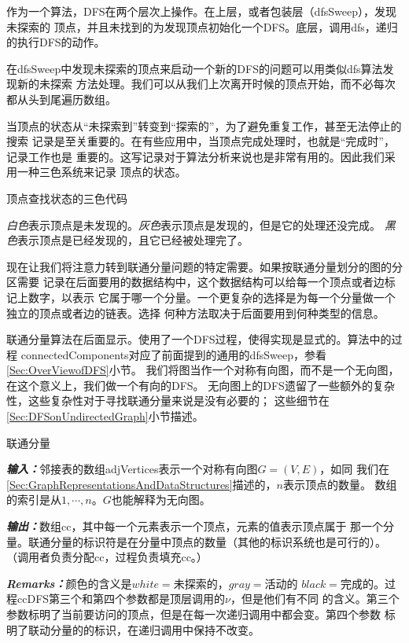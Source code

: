 作为一个算法，DFS在两个层次上操作。在上层，或者包装层（dfsSweep），发现未探索的
顶点，并且未找到的为发现顶点初始化一个DFS。底层，调用dfs，递归的执行DFS的动作。

在dfsSweep中发现未探索的顶点来启动一个新的DFS的问题可以用类似dfs算法发现新的未探索
方法处理。我们可以从我们上次离开时候的顶点开始，而不必每次都从头到尾遍历数组。

当顶点的状态从“未探索到”转变到“探索的”，为了避免重复工作，甚至无法停止的搜索
记录是至关重要的。在有些应用中，当顶点完成处理时，也就是“完成时”，记录工作也是
重要的。这写记录对于算法分析来说也是非常有用的。因此我们采用一种三色系统来记录
顶点的状态。

\begin{definition}
顶点查找状态的三色代码

\emph{白色}表示顶点是未发现的。\emph{灰色}表示顶点是发现的，但是它的处理还没完成。
\emph{黑色}表示顶点是已经发现的，且它已经被处理完了。
\end{definition}

现在让我们将注意力转到联通分量问题的特定需要。如果按联通分量划分的图的分区需要
记录在后面要用的数据结构中，这个数据结构可以给每一个顶点或者边标记上数字，以表示
它属于哪一个分量。一个更复杂的选择是为每一个分量做一个独立的顶点或者边的链表。选择
何种方法取决于后面要用到何种类型的信息。

联通分量算法在后面显示。使用了一个DFS过程，使得实现是显式的。算法中的过程
connectedComponents对应了前面提到的通用的dfsSweep，参看\ref{Sec:OverViewofDFS}小节。
我们将图当作一个对称有向图，而不是一个无向图，在这个意义上，我们做一个有向的DFS。
无向图上的DFS遗留了一些额外的复杂性，这些复杂性对于寻找联通分量来说是没有必要的；
这些细节在\ref{Sec:DFSonUndirectedGraph}小节描述。

\begin{algorithm}
联通分量

{\textbf{\emph{输入：}}}邻接表的数组adjVertices表示一个对称有向图$G=(V,E)$，如同
我们在\ref{Sec:GraphRepresentationsAndDataStructures}描述的，$n$表示顶点的数量。
数组的索引是从$1, \cdots, n$。$G$也能解释为无向图。

{\textbf{\emph{输出：}}}数组cc，其中每一个元素表示一个顶点，元素的值表示顶点属于
那一个分量。联通分量的标识符是在分量中顶点的数量（其他的标识系统也是可行的）。
（调用者负责分配cc，过程负责填充cc。）

{\textbf{\emph{Remarks：}}}颜色的含义是$white=\mbox{未探索的}$，$gray=\mbox{活动的}$
$black=\mbox{完成的}$。过程ccDFS第三个和第四个参数都是顶层调用的$\nu$，但是他们有不同
的含义。第三个参数标明了当前要访问的顶点，但是在每一次递归调用中都会变。第四个参数
标明了联动分量的的标识，在递归调用中保持不改变。
\end{algorithm}

